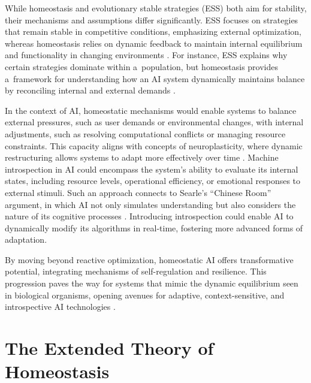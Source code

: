 \documentclass[%
  manuscript=article,
  year=2024,
  volume=77,
  doi=10.59203/zfn.77.706,
]{zfn}
\begin{document}
While homeostasis and evolutionary stable strategies (ESS) both aim for stability, their mechanisms and assumptions differ significantly. ESS focuses on strategies that remain stable in competitive conditions, emphasizing external optimization, whereas homeostasis relies on dynamic feedback to maintain internal equilibrium and functionality in changing environments 
\parencites[][]{maynard_smith_theory_1974}[][]{dawkins_selfish_1989}. %
 For instance, ESS explains why certain strategies dominate within a~population, but homeostasis provides a~framework for understanding how an AI system dynamically maintains balance by reconciling internal and external demands 
\parencites[][]{walter_imitation_1950}[][]{ashby_design_1952}.%




In the context of AI, homeostatic mechanisms would enable systems to balance external pressures, such as user demands or environmental changes, with internal adjustments, such as resolving computational conflicts or managing resource constraints. This capacity aligns with concepts of neuroplasticity, where dynamic restructuring allows systems to adapt more effectively over time 
\parencite[][]{zhang_dynamic_2022}. %
 Machine introspection in AI could encompass the system's ability to evaluate its internal states, including resource levels, operational efficiency, or emotional responses to external stimuli. Such an approach connects to Searle's ``Chinese Room'' argument, in which AI not only simulates understanding but also considers the nature of its cognitive processes 
\parencite[][]{searle_minds_1980}. %
 Introducing introspection could enable AI to dynamically modify its algorithms in real-time, fostering more advanced forms of adaptation.



By moving beyond reactive optimization, homeostatic AI offers transformative potential, integrating mechanisms of self-regulation and resilience. This progression paves the way for systems that mimic the dynamic equilibrium seen in biological organisms, opening avenues for adaptive, context-sensitive, and introspective AI technologies 
\parencite[][]{tegmark_life_2018}.%




\section*{The Extended Theory of Homeostasis}
\end{document}
